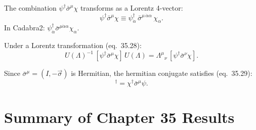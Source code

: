 \documentclass[12pt]{article}
\newcommand{\psidag}{\psi^{\dagger}}
\newcommand{\dal}{\dot\alpha}
\newcommand{\sigmabar}{\bar{\sigma}}
\begin{document}
The combination $\psi^\dagger\bar\sigma^\mu\chi$ transforms as a
Lorentz 4-vector:
\begin{equation}
  \psi^\dagger\bar\sigma^\mu\chi
  \equiv \psi^\dagger_{\dot\alpha}\,\bar\sigma^{\mu\,\dot\alpha\alpha}\,\chi_\alpha.
  \tag{35.27}
\end{equation}
In Cadabra2: $\psidag_{\dal} \sigmabar^{\mu \dal \alpha} \chi_{\alpha}$.

\medskip
Under a Lorentz transformation (eq.~35.28):
\begin{equation}
  U(\Lambda)^{-1}\,[\psi^\dagger\bar\sigma^\mu\chi]\,U(\Lambda)
  = {\Lambda^\mu}{}_\nu\,[\psi^\dagger\bar\sigma^\nu\chi].
  \tag{35.28}
\end{equation}

Since $\bar\sigma^\mu = (I,-\vec\sigma)$ is Hermitian,
the hermitian conjugate satisfies (eq.~35.29):
\begin{equation}
  [\psi^\dagger\bar\sigma^\mu\chi]^\dagger = \chi^\dagger\bar\sigma^\mu\psi.
  \tag{35.29}
\end{equation}

\section{Summary of Chapter 35 Results}
\end{document}
